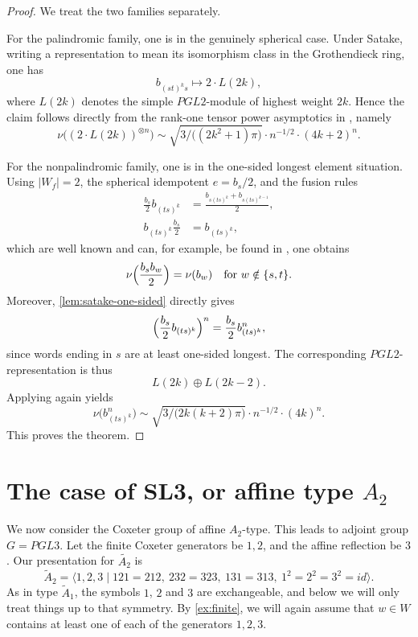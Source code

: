 \documentclass[a4paper,11pt]{amsart}
\newcommand{\Aone}{\widetilde A_{1}}
\newcommand{\nuop}{\nu}
\numberwithin{equation}{subsection}
\theoremstyle{definition}
\theoremstyle{remark}
\begin{document}
\begin{proof}
We treat the two families separately.

For the palindromic family, one is in the genuinely spherical case. Under
Satake, writing a representation to mean its isomorphism class in the
Grothendieck ring, one has
\[
b_{(st)^ks}\longmapsto 2\cdot L(2k),
\]
where $L(2k)$ denotes the simple $PGL2$-module of highest weight $2k$.
Hence the claim follows directly from the rank-one tensor power asymptotics in
\cite[Theorem 2.5]{CEO19}, namely
\[
\nuop\bigl((2\cdot L(2k))^{\otimes n}\bigr)
\sim
\sqrt{3/\big((2k^2+1)\pi\big)}\cdot n^{-1/2}\cdot (4k+2)^n.
\]

For the nonpalindromic family, one is in the one-sided longest element
situation. Using $|W_f|=2$, the spherical idempotent $e=b_s/2$, and the fusion
rules
\begin{align*}
\frac{b_s}{2}b_{(ts)^k}
&=
\frac{b_{s(ts)^k}+b_{s(ts)^{k-1}}}{2},\\
b_{(ts)^k}\frac{b_s}{2}
&=
b_{(ts)^k},
\end{align*}
which are well known and can, for example, be found in
\cite[Section 3]{Tu-sandwich-cellular}, one obtains
\[
\nuop\Bigl(\frac{b_sb_w}{2}\Bigr)=\nuop(b_w)
\quad\text{for }w\notin\{s,t\}.
\]
Moreover, \autoref{lem:satake-one-sided} directly gives
\[
\Bigl(\frac{b_s}{2}b_{(ts)^k}\Bigr)^n
=
\frac{b_s}{2}b_{(ts)^k}^n,
\]
since words ending in $s$ are at least one-sided longest. The corresponding
$PGL2$-representation is thus
\[
L(2k)\oplus L(2k-2).
\]
Applying again \cite[Theorem 2.5]{CEO19} yields
\[
\nuop\bigl(b_{(ts)^k}^n\bigr)
\sim
\sqrt{3/\big(2k(k+2)\pi\big)}\cdot n^{-1/2}\cdot (4k)^n.
\]
This proves the theorem.
\end{proof}

\section{The case of SL3, or affine type \texorpdfstring{$A_2$}{A2}}\label{sec:sl3}

We now consider the Coxeter group of affine $A_2$-type. This leads to adjoint group
\(G=PGL3\). Let the finite Coxeter generators be $1,2$, and the affine reflection be $3$. Our presentation for $\widetilde{A_2}$ is
\[
\widetilde A_2=\langle 1,2,3\mid 121=212,\ 232=323,\ 131=313,\ 1^2=2^2=3^2=id\rangle.
\]
As in type \(\Aone\), the symbols \(1\), \(2\) and \(3\) are exchangeable, and
below we will only treat things up to that symmetry. By \autoref{ex:finite}, we will again 
assume that $w\in W$ contains at least one of each of the generators $1,2,3$. 
\end{document}
